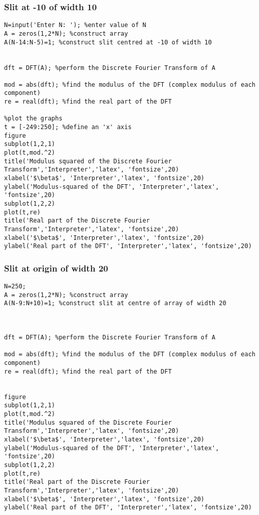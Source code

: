 \documentclass[a4paper,11pt]{article}
\begin{document}
\subsubsection{Slit at -10 of width 10}
\begin{lstlisting}[style=matlab-editor]
N=input('Enter N: '); %enter value of N
A = zeros(1,2*N); %construct array
A(N-14:N-5)=1; %construct slit centred at -10 of width 10 


dft = DFT(A); %perform the Discrete Fourier Transform of A

mod = abs(dft); %find the modulus of the DFT (complex modulus of each component)
re = real(dft); %find the real part of the DFT

%plot the graphs
t = [-249:250]; %define an 'x' axis
figure
subplot(1,2,1)
plot(t,mod.^2)
title('Modulus squared of the Discrete Fourier Transform','Interpreter','latex', 'fontsize',20)
xlabel('$\beta$', 'Interpreter','latex', 'fontsize',20)
ylabel('Modulus-squared of the DFT', 'Interpreter','latex', 'fontsize',20)
subplot(1,2,2)
plot(t,re)
title('Real part of the Discrete Fourier Transform','Interpreter','latex', 'fontsize',20)
xlabel('$\beta$', 'Interpreter','latex', 'fontsize',20)
ylabel('Real part of the DFT', 'Interpreter','latex', 'fontsize',20)
\end{lstlisting}
\subsubsection{Slit at origin of width 20}
\begin{lstlisting}[style=matlab-editor]
N=250;
A = zeros(1,2*N); %construct array
A(N-9:N+10)=1; %construct slit at centre of array of width 20



dft = DFT(A); %perform the Discrete Fourier Transform of A

mod = abs(dft); %find the modulus of the DFT (complex modulus of each component)
re = real(dft); %find the real part of the DFT 


figure
subplot(1,2,1)
plot(t,mod.^2)
title('Modulus squared of the Discrete Fourier Transform','Interpreter','latex', 'fontsize',20)
xlabel('$\beta$', 'Interpreter','latex', 'fontsize',20)
ylabel('Modulus-squared of the DFT', 'Interpreter','latex', 'fontsize',20)
subplot(1,2,2)
plot(t,re)
title('Real part of the Discrete Fourier Transform','Interpreter','latex', 'fontsize',20)
xlabel('$\beta$', 'Interpreter','latex', 'fontsize',20)
ylabel('Real part of the DFT', 'Interpreter','latex', 'fontsize',20)
\end{lstlisting}
\end{document}
